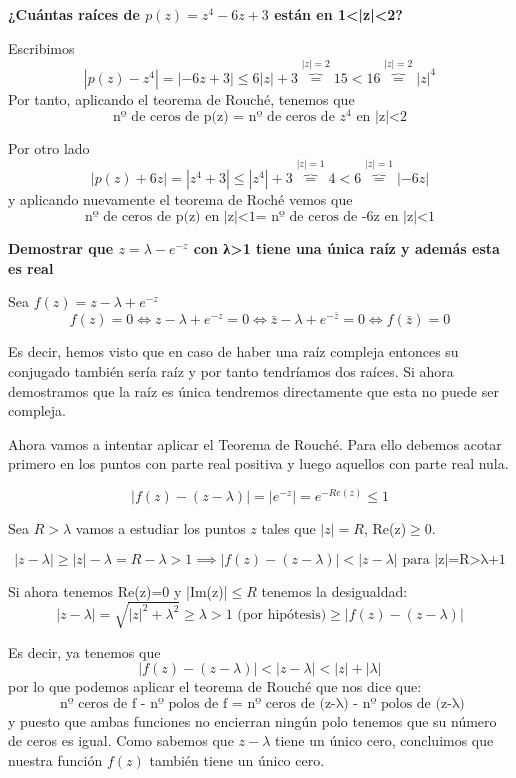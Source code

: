 \documentclass{apuntes}
\begin{document}
\begin{example}
\textbf{¿Cuántas raíces de $p(z)=z^4-6z+3$ están en 1<|z|<2?}

Escribimos
\[|p(z)-z^4| = |-6z+3|\leq 6|z|+3 \overbrace{=}^{|z|=2} 15 < 16 \overbrace{=}^{|z|=2}|z|^4 \]
Por tanto, aplicando el teorema de Rouché, tenemos que
\[\text{nº de ceros de p(z) = nº de ceros de } z^4 \text{ en |z|<2}\]

Por otro lado
\[|p(z)+6z|=|z^4+3|\leq |z^4|+3 \overbrace{=}^{|z|=1} 4 < 6\overbrace{=}^{|z|=1}|-6z|\]
y aplicando nuevamente el teorema de Roché vemos que
\[\text{nº de ceros de p(z) en |z|<1= nº de ceros de -6z en |z|<1}\]
\end{example}

\begin{example}
\textbf{Demostrar que $z=λ-e^{-z}$ con λ>1 tiene una única raíz y además esta es real}

Sea $f(z)=z-λ+e^{-z}$
\[f(z)=0 \iff z-λ+e^{-z} = 0 \iff \bar{z}-λ+e^{-\bar{z}}=0 \iff f(\bar{z})=0\]

Es decir, hemos visto que en caso de haber una raíz compleja entonces su conjugado también sería raíz y por tanto tendríamos dos raíces. Si ahora demostramos que la raíz es única tendremos directamente que esta no puede ser compleja.

Ahora vamos a intentar aplicar el Teorema de Rouché. Para ello debemos acotar primero en los puntos con parte real positiva y luego aquellos con parte real nula.

\[|f(z)-(z-λ)|=|e^{-z}|=e^{-Re(z)} \leq 1\]

Sea $R>λ$ vamos a estudiar los puntos $z$ tales que $|z|=R$, Re(z)$\geq 0$.

\[|z-λ|\geq |z|-λ = R - λ > 1 \implies |f(z)-(z-λ)| < |z-λ| \text{ para |z|=R>λ+1}\]

Si ahora tenemos Re(z)=0 y |Im(z)|$\leq R$ tenemos la desigualdad:
\[|z-λ| = \sqrt{|z|^2+λ^2}\geq λ > 1 \text{ (por hipótesis)} \geq |f(z)-(z-λ)|\]

Es decir, ya tenemos que
\[|f(z)-(z-λ)|<|z-λ|<|z|+|λ|\]
por lo que podemos aplicar el teorema de Rouché que nos dice que:
\[\text{ nº ceros de  f - nº polos de f = nº ceros de (z-λ) - nº polos de (z-λ)}\]
y puesto que ambas funciones no encierran ningún polo tenemos que su número de ceros es igual. Como sabemos que $z-λ$ tiene un único cero, concluimos que nuestra función $f(z)$ también tiene un único cero.
\end{example}
\end{document}
